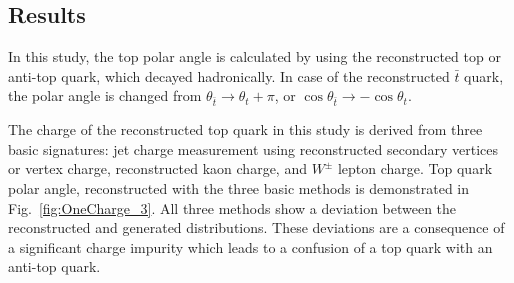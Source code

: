 \subsection{Results}

In this study, the top polar angle is calculated by using the reconstructed top or anti-top quark, which decayed hadronically.
In case of the reconstructed $\bar{t}$ quark, the polar angle is changed from $\theta_{\bar{t}} \to \theta_{t} + \pi$, or $\cos\theta_{\bar{t}} \to -\cos\theta_{t}$. 

The charge of the reconstructed top quark in this study is derived from three basic signatures: jet charge measurement using reconstructed secondary vertices or vertex charge, reconstructed kaon charge, and $W^\pm$ lepton charge. 
Top quark polar angle, reconstructed with the three basic methods is demonstrated in Fig.~\ref{fig:OneCharge_3}.
All three methods show a deviation between the reconstructed and generated distributions.
These deviations are a consequence of a significant charge impurity which leads to a confusion of a top quark with an anti-top quark.


